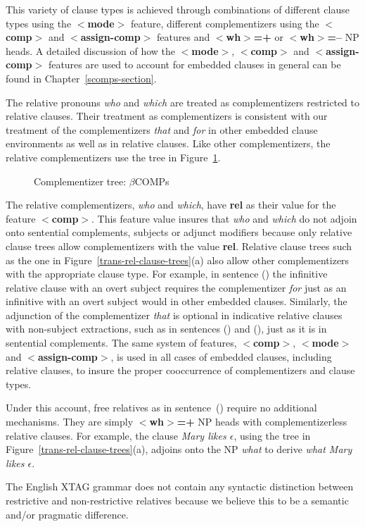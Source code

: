 
This variety of clause types is achieved through combinations of different
clause types using the {\bf $<$mode$>$} feature, different complementizers
using the {\bf $<$comp$>$} and {\bf $<$assign-comp$>$} features and {\bf
$<$wh$>$=+} or {\bf $<$wh$>$=--} NP heads. A detailed discussion of how the
{\bf $<$mode$>$}, {\bf $<$comp$>$} and {\bf $<$assign-comp$>$} features are
used to account for embedded clauses in general can be found in
Chapter~\ref{scomps-section}.

The relative pronouns {\it who} and {\it which} are treated as complementizers
restricted to relative clauses.  Their treatment as complementizers is
consistent with our treatment of the complementizers {\it that} and {\it for}
in other embedded clause environments as well as in relative clauses. Like
other complementizers, the relative complementizers use the tree in
Figure~\ref{betaCOMPs}.


\begin{figure}[htb]
\centering
\mbox{}
\caption{Complementizer tree: $\beta$COMPs}
\label{betaCOMPs}
\end{figure}

The relative complementizers, {\it who} and {\it which}, have {\bf rel} as
their value for the feature {\bf $<$comp$>$}. This feature value insures that
{\it who} and {\it which} do not adjoin onto sentential complements, subjects
or adjunct modifiers because only relative clause trees allow complementizers
with the value {\bf rel}.  Relative clause trees such as the one in
Figure~\ref{trans-rel-clause-trees}(a) also allow other complementizers with
the appropriate clause type. For example, in sentence () the infinitive
relative clause with an overt subject requires the complementizer {\it for}
just as an infinitive with an overt subject would in other embedded
clauses. Similarly, the adjunction of the complementizer {\it that} is optional
in indicative relative clauses with non-subject extractions, such as in
sentences () and (), just as it is in sentential complements. The
same system of features, {\bf $<$comp$>$}, {\bf $<$mode$>$} and {\bf
$<$assign-comp$>$}, is used in all cases of embedded clauses, including
relative clauses, to insure the proper cooccurrence of complementizers and
clause types.

Under this account, free relatives as in sentence~() require no
additional mechanisms. They are simply {\bf $<$wh$>$=+} NP heads with
complementizerless relative clauses. For example, the clause {\it Mary likes
$\epsilon$}, using the tree in Figure~\ref{trans-rel-clause-trees}(a), adjoins
onto the NP {\it what} to derive {\it what Mary likes $\epsilon$}.

The English XTAG grammar does not contain any  syntactic distinction between
restrictive and non-restrictive relatives because we believe this to
be a semantic and/or pragmatic difference.
